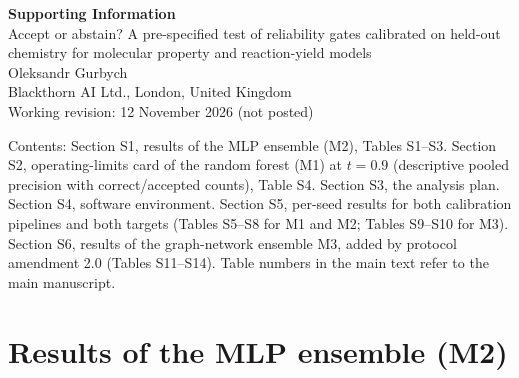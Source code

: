 \documentclass[11pt,letterpaper]{article}
\begin{document}
\begin{center}
{\Large\bfseries Supporting Information}\\[0.6em]
{\large Accept or abstain? A pre-specified test of reliability gates calibrated on held-out chemistry for molecular property and reaction-yield models}\\[0.6em]
Oleksandr Gurbych\\
{\small Blackthorn AI Ltd., London, United Kingdom}\\
{\small Working revision: 12 November 2026 (not posted)}
\end{center}

\noindent Contents: Section S1, results of the MLP ensemble (M2), Tables S1--S3. Section S2, operating-limits card of the random forest (M1) at $t = 0.9$ (descriptive pooled precision with correct/accepted counts), Table S4. Section S3, the analysis plan. Section S4, software environment. Section S5, per-seed results for both calibration pipelines and both targets (Tables S5--S8 for M1 and M2; Tables S9--S10 for M3). Section S6, results of the graph-network ensemble M3, added by protocol amendment 2.0 (Tables S11--S14). Table numbers in the main text refer to the main manuscript.

\section{Results of the MLP ensemble (M2)}

\begin{table}[htbp]
\centering
\caption{Ungated accuracy of M2 (mean $\pm$ s.d. over five seeds). Error rate: share of predictions with an absolute error above 0.5 log units (logP) or 10 percentage points (yield).}
\small

\end{table}

\begin{table}[htbp]
\centering
\caption{AURC of the selective error rate for M2 (lower is better; mean over seeds). ``No gate'' is the ungated error rate.}
\small

\end{table}

\begin{table}[htbp]
\centering
\caption{Operating-limits card for Gate~B with M2 at $t = 0.8$. Descriptive pooled precision with correct/accepted counts and accepting seeds for both pipelines; other definitions as in Table~4 of the main text. No independent-binomial interval is reported. The $C_h$-calibrated gate abstained on every query in every seed.}
\small
\resizebox{\linewidth}{!}{}
\end{table}
\end{document}
